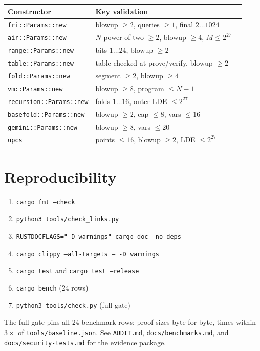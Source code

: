 \documentclass[11pt,a4paper]{article}
\begin{document}
\begin{longtable}{@{}L{0.28\linewidth}L{0.64\linewidth}@{}}
\toprule
Constructor & Key validation \\
\midrule
\endhead
\texttt{fri::Params::new} & blowup $\ge2$, queries $\ge1$, final $2\dots1024$ \\
\texttt{air::Params::new} & $N$ power of two $\ge2$, blowup $\ge4$, $M\le2^{27}$ \\
\texttt{range::Params::new} & bits $1\dots24$, blowup $\ge2$ \\
\texttt{table::Params::new} & table checked at prove/verify, blowup $\ge2$ \\
\texttt{fold::Params::new} & segment $\ge2$, blowup $\ge4$ \\
\texttt{vm::Params::new} & blowup $\ge8$, program $\le N-1$ \\
\texttt{recursion::Params::new} & folds $1\dots16$, outer LDE $\le2^{27}$ \\
\texttt{basefold::Params::new} & blowup $\ge2$, cap $\le8$, vars $\le16$ \\
\texttt{gemini::Params::new} & blowup $\ge8$, vars $\le20$ \\
\texttt{upcs} & points $\le16$, blowup $\ge2$, LDE $\le2^{27}$ \\
\bottomrule
\end{longtable}

\section{Reproducibility}

\begin{enumerate}[leftmargin=1.3em]
\item \texttt{cargo fmt --check}
\item \texttt{python3 tools/check\_links.py}
\item \texttt{RUSTDOCFLAGS="-D warnings" cargo doc --no-deps}
\item \texttt{cargo clippy --all-targets -- -D warnings}
\item \texttt{cargo test} and \texttt{cargo test --release}
\item \texttt{cargo bench} (24 rows)
\item \texttt{python3 tools/check.py} (full gate)
\end{enumerate}

The full gate pins all 24 benchmark rows: proof sizes byte-for-byte, times
within $3\times$ of \texttt{tools/baseline.json}. See
\texttt{AUDIT.md}, \texttt{docs/benchmarks.md}, and
\texttt{docs/security-tests.md} for the evidence package.
\end{document}
